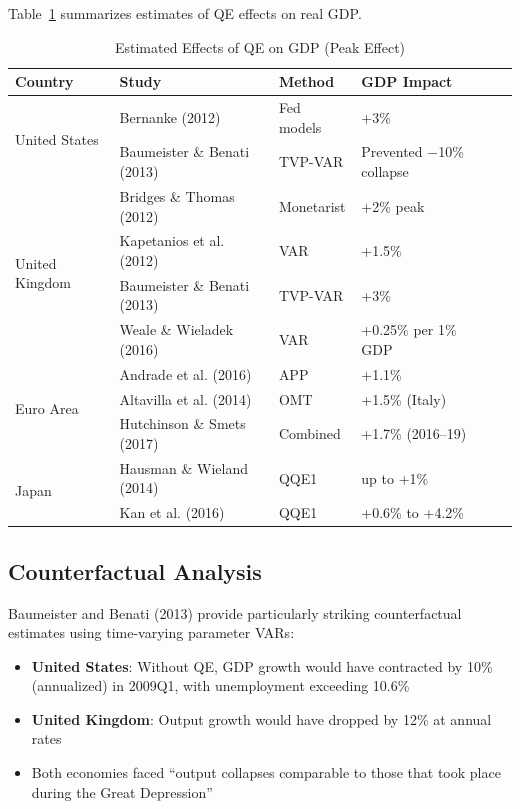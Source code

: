 \documentclass[11pt,a4paper]{article}
\begin{document}
Table~\ref{tab:gdp} summarizes estimates of QE effects on real GDP.

\begin{table}[H]
\centering
\caption{Estimated Effects of QE on GDP (Peak Effect)}
\label{tab:gdp}
\begin{tabular}{lllll}
\toprule
\textbf{Country} & \textbf{Study} & \textbf{Method} & \textbf{GDP Impact} \\
\midrule
\multirow{2}{*}{United States}
    & Bernanke (2012) & Fed models & +3\% \\
    & Baumeister \& Benati (2013) & TVP-VAR & Prevented $-$10\% collapse \\
\midrule
\multirow{4}{*}{United Kingdom}
    & Bridges \& Thomas (2012) & Monetarist & +2\% peak \\
    & Kapetanios et al. (2012) & VAR & +1.5\% \\
    & Baumeister \& Benati (2013) & TVP-VAR & +3\% \\
    & Weale \& Wieladek (2016) & VAR & +0.25\% per 1\% GDP \\
\midrule
\multirow{3}{*}{Euro Area}
    & Andrade et al. (2016) & APP & +1.1\% \\
    & Altavilla et al. (2014) & OMT & +1.5\% (Italy) \\
    & Hutchinson \& Smets (2017) & Combined & +1.7\% (2016--19) \\
\midrule
\multirow{2}{*}{Japan}
    & Hausman \& Wieland (2014) & QQE1 & up to +1\% \\
    & Kan et al. (2016) & QQE1 & +0.6\% to +4.2\% \\
\bottomrule
\end{tabular}
\end{table}

\subsection{Counterfactual Analysis}

Baumeister and Benati (2013) provide particularly striking counterfactual estimates using time-varying parameter VARs:

\begin{itemize}
    \item \textbf{United States}: Without QE, GDP growth would have contracted by 10\% (annualized) in 2009Q1, with unemployment exceeding 10.6\%
    \item \textbf{United Kingdom}: Output growth would have dropped by 12\% at annual rates
    \item Both economies faced ``output collapses comparable to those that took place during the Great Depression''
\end{itemize}
\end{document}
